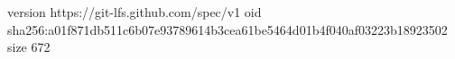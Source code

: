 version https://git-lfs.github.com/spec/v1
oid sha256:a01f871db511c6b07e93789614b3cea61be5464d01b4f040af03223b18923502
size 672
